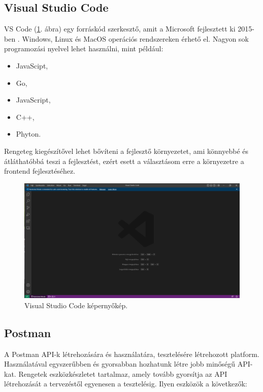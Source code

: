 \subsection{Visual Studio Code}

VS Code (\ref{fig:VSCode}. ábra) egy forráskód szerkesztő, amit a Microsoft fejlesztett ki 2015-ben \cite{VSCode}. Windows, Linux és MacOS operációs rendszereken érhető el. Nagyon sok programozási nyelvel lehet használni, mint például:

\begin{itemize}
\item JavaScipt,
\item Go,
\item JavaScript,
\item C++,
\item Phyton.
\end{itemize}

Rengeteg kiegészítővel lehet bővíteni a fejlesztő környezetet, ami könnyebbé és átláthatóbbá teszi a fejlesztést, ezért esett a választásom erre a környezetre a frontend fejlesztéséhez.

\begin{figure}[h]
\centering
\includegraphics[scale=0.6]{images/VSCode.png}
\caption{Visual Studio Code képernyőkép.}
\label{fig:VSCode}
\end{figure}
\newpage

\subsection{Postman}

A Postman \cite{Postman} API-k létrehozására és használatára, tesztelésére létrehozott platform. Használatával egyszerűbben és gyorsabban hozhatunk létre jobb minőségű API-kat. Rengetek eszközkészletet tartalmaz, amely tovább gyorsítja az API létrehozását a  tervezéstől egyenesen a tesztelésig. Ilyen eszközök a következők:

